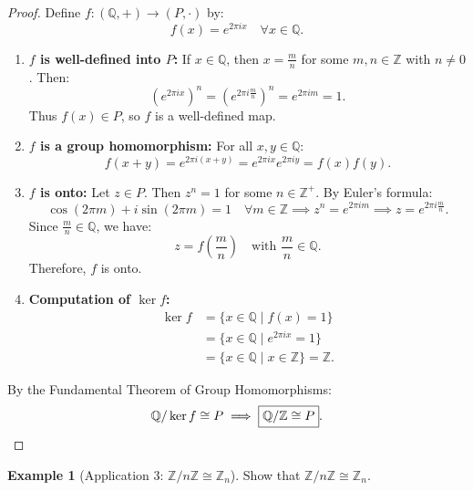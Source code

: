 \documentclass[12pt]{article}
\theoremstyle{definition}
\newtheorem{example}[definition]{Example}
\theoremstyle{plain}
\begin{document}
\begin{proof}
Define $f: (\mathbb{Q}, +) \to (P, \cdot)$ by:
\[
f(x) = e^{2\pi i x} \quad \forall x \in \mathbb{Q}.
\]
\begin{enumerate}
    \item \textbf{$f$ is well-defined into $P$:}
    If $x \in \mathbb{Q}$, then $x = \frac{m}{n}$ for some $m, n \in \mathbb{Z}$ with $n \neq 0$. Then:
    \[
    (e^{2\pi i x})^n = \left(e^{2\pi i \frac{m}{n}}\right)^n = e^{2\pi i m} = 1.
    \]
    Thus $f(x) \in P$, so $f$ is a well-defined map.
    
    \item \textbf{$f$ is a group homomorphism:}
    For all $x, y \in \mathbb{Q}$:
    \[
    f(x+y) = e^{2\pi i (x+y)} = e^{2\pi i x} e^{2\pi i y} = f(x) f(y).
    \]
    
    \item \textbf{$f$ is onto:}
    Let $z \in P$. Then $z^n = 1$ for some $n \in \mathbb{Z}^+$.
    By Euler's formula:
    \[
    \cos(2\pi m) + i\sin(2\pi m) = 1 \quad \forall m \in \mathbb{Z} \implies z^n = e^{2\pi i m} \implies z = e^{2\pi i \frac{m}{n}}.
    \]
    Since $\frac{m}{n} \in \mathbb{Q}$, we have:
    \[
    z = f\left(\frac{m}{n}\right) \quad \text{with } \frac{m}{n} \in \mathbb{Q}.
    \]
    Therefore, $f$ is onto.
    
    \item \textbf{Computation of $\ker f$:}
    \begin{align*}
    \ker f &= \{ x \in \mathbb{Q} \mid f(x) = 1 \} \\
    &= \{ x \in \mathbb{Q} \mid e^{2\pi i x} = 1 \} \\
    &= \{ x \in \mathbb{Q} \mid x \in \mathbb{Z} \} = \mathbb{Z}.
    \end{align*}
\end{enumerate}
By the Fundamental Theorem of Group Homomorphisms:
\[
\mathbb{Q}/\ker f \cong P \implies \boxed{\mathbb{Q}/\mathbb{Z} \cong P}. \qedhere
\]
\end{proof}

\begin{example}[Application 3: $\mathbb{Z}/n\mathbb{Z} \cong \mathbb{Z}_n$]
Show that $\mathbb{Z}/n\mathbb{Z} \cong \mathbb{Z}_n$.
\end{example}
\end{document}
